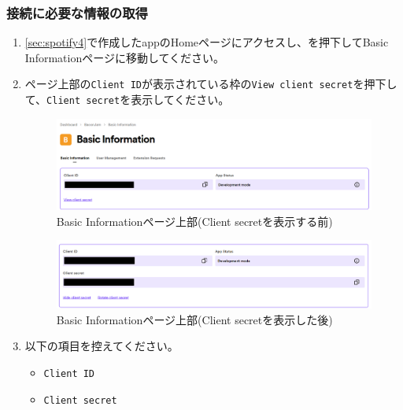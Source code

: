         \subsubsection{接続に必要な情報の取得}
        \label{sec:spotify5}
            \begin{enumerate}
                \item \ref{sec:spotify4}で作成したappのHomeページにアクセスし、を押下してBasic Informationページに移動してください。
                \label{item:spotify10}

                \item ページ上部の\texttt{Client ID}が表示されている枠の\texttt{View client secret}を押下して、\texttt{Client secret}を表示してください。
                \label{item:spotify11}
                    \begin{figure}[htbp]
                        \centering
                        \includegraphics[width=\linewidth]{./pictures/Spotify8.png}
                        \caption{Basic Informationページ上部(Client secretを表示する前)}
                        \label{img:spotify8}
                    \end{figure}
                    \begin{figure}[htbp]
                        \centering
                        \includegraphics[width=\linewidth]{./pictures/Spotify9.png}
                        \caption{Basic Informationページ上部(Client secretを表示した後)}
                        \label{img:spotify9}
                    \end{figure}

                \item 以下の項目を控えてください。
                \label{item:spotify12}
                    \begin{itemize}
                        \item \texttt{Client ID}
                        \item \texttt{Client secret}
                    \end{itemize}
            \end{enumerate}

